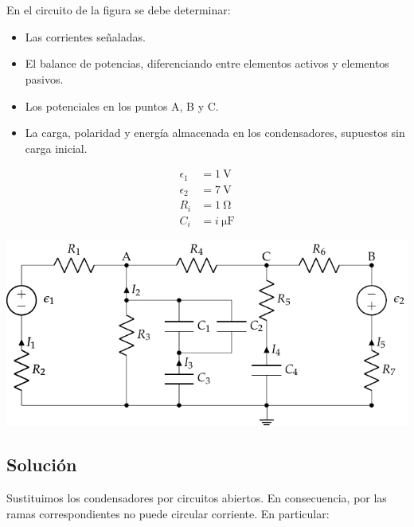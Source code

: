 \documentclass[10pt]{article}
\begin{document}
\clearpage

\section{}

En el circuito de la figura se debe determinar:
\begin{itemize}
\item Las corrientes señaladas.
\item El balance de potencias, diferenciando entre elementos activos y elementos pasivos.
\item Los potenciales en los puntos A, B y C.
\item La carga, polaridad y energía almacenada en los condensadores, supuestos sin carga inicial.
\end{itemize}

\begin{minipage}[c]{0.3\linewidth}
  \begin{align*}
    \epsilon_1&=\SI{1}{\volt}\\
    \epsilon_2&=\SI{7}{\volt}\\
    R_i &= \SI{1}{\ohm}\\
    C_i &= \SI{i}{\micro\farad}
  \end{align*}
\end{minipage}
\begin{minipage}[c]{0.7\linewidth}
  \includegraphics{figs/mallas_agrupacion_condensadores.pdf}
\end{minipage}

\subsection*{Solución}

Sustituimos los condensadores por circuitos abiertos. En consecuencia, por las ramas correspondientes no puede circular corriente. En particular:
\end{document}
